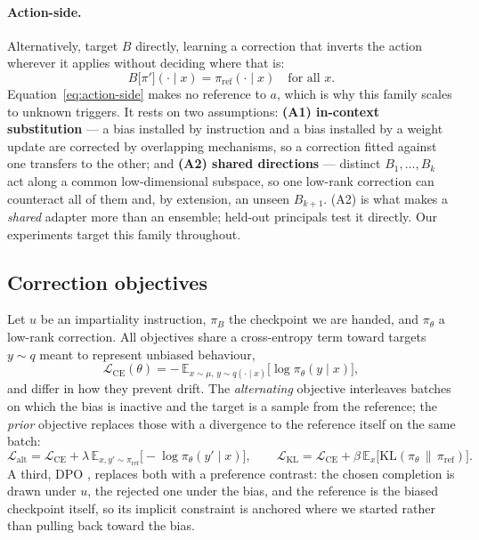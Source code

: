 \documentclass{article}
\newcommand{\piref}{\pi_{\mathrm{ref}}}
\newcommand{\pibias}{\pi_{B}}
\newcommand{\KL}{\mathrm{KL}}
\begin{document}
\paragraph{Action-side.}
Alternatively, target $B$ directly, learning a correction that inverts the
action wherever it applies without deciding where that is:
\begin{equation}
\label{eq:action-side}
B\big[\pi'\big](\cdot \mid x) = \piref(\cdot \mid x) \quad \text{for all } x .
\end{equation}
Equation~\eqref{eq:action-side} makes no reference to $a$, which is why this
family scales to unknown triggers. It rests on two assumptions:
\textbf{(A1) in-context substitution} --- a bias installed by instruction and a
bias installed by a weight update are corrected by overlapping mechanisms, so a
correction fitted against one transfers to the other; and
\textbf{(A2) shared directions} --- distinct $B_1,\dots,B_k$ act along a common
low-dimensional subspace, so one low-rank correction can counteract all of them
and, by extension, an unseen $B_{k+1}$. (A2) is what makes a \emph{shared}
adapter more than an ensemble; held-out principals test it directly. Our
experiments target this family throughout.

\subsection{Correction objectives}

Let $u$ be an impartiality instruction, $\pibias$ the checkpoint we are handed,
and $\pi_\theta$ a low-rank correction. All objectives share a cross-entropy
term toward targets $y \sim q$ meant to represent unbiased behaviour,
\begin{equation}
\label{eq:ce}
\mathcal{L}_{\mathrm{CE}}(\theta) =
  -\,\mathbb{E}_{x \sim \mu,\, y \sim q(\cdot \mid x)}\big[\log \pi_\theta(y \mid x)\big],
\end{equation}
and differ in how they prevent drift. The \emph{alternating} objective
interleaves batches on which the bias is inactive and the target is a sample
from the reference; the \emph{prior} objective replaces those with a divergence
to the reference itself on the same batch:
\begin{equation}
\label{eq:objectives}
\mathcal{L}_{\mathrm{alt}} = \mathcal{L}_{\mathrm{CE}}
  + \lambda\, \mathbb{E}_{x, y' \sim \piref}\big[-\log \pi_\theta(y' \mid x)\big],
\qquad
\mathcal{L}_{\mathrm{KL}} = \mathcal{L}_{\mathrm{CE}}
  + \beta\, \mathbb{E}_{x}\big[\KL(\pi_\theta \,\|\, \piref)\big].
\end{equation}
A third, DPO \citep{rafailov2023dpo}, replaces both with a preference contrast:
the chosen completion is drawn under $u$, the rejected one under the bias, and
the reference is the biased checkpoint itself, so its implicit constraint is
anchored where we started rather than pulling back toward the bias.
\end{document}
